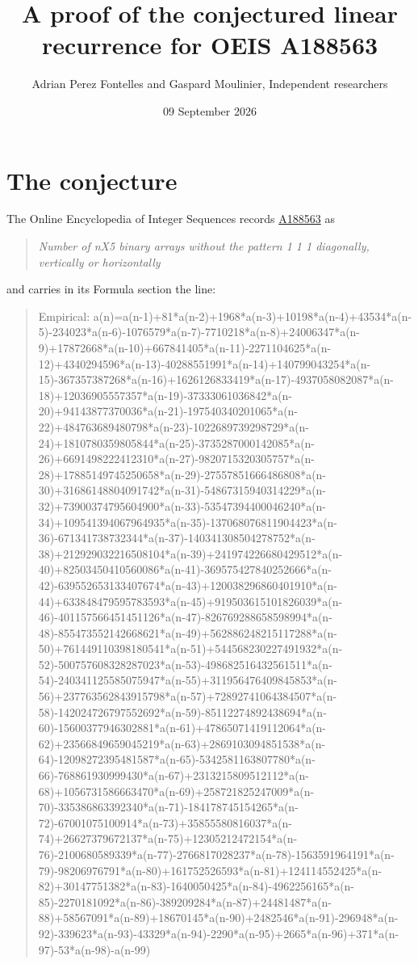 \documentclass[11pt]{article}
\title{A proof of the conjectured linear recurrence for OEIS A188563}
\author{Adrian Perez Fontelles and Gaspard Moulinier, Independent researchers}
\date{09 September 2026}
\theoremstyle{definition}
\begin{document}
\maketitle
\section{The conjecture}

The Online Encyclopedia of Integer Sequences records \href{https://oeis.org/A188563}{A188563} as

\begin{quote}\itshape Number of nX5 binary arrays without the pattern 1 1 1 diagonally, vertically or horizontally\end{quote}

and carries in its Formula section the line:

\begin{quote}\ttfamily Empirical: a(n)=a(n-1)+81*a(n-2)+1968*a(n-3)+10198*a(n-4)+43534*a(n-5)-234023*a(n-6)-1076579*a(n-7)-7710218*a(n-8)+24006347*a(n-9)+17872668*a(n-10)+667841405*a(n-11)-2271104625*a(n-12)+4340294596*a(n-13)-40288551991*a(n-14)+140799043254*a(n-15)-367357387268*a(n-16)+1626126833419*a(n-17)-4937058082087*a(n-18)+12036905557357*a(n-19)-37333061036842*a(n-20)+94143877370036*a(n-21)-197540340201065*a(n-22)+484763689480798*a(n-23)-1022689739298729*a(n-24)+1810780359805844*a(n-25)-3735287000142085*a(n-26)+6691498222412310*a(n-27)-9820715320305757*a(n-28)+17885149745250658*a(n-29)-27557851666486808*a(n-30)+31686148804091742*a(n-31)-54867315940314229*a(n-32)+73900374795604900*a(n-33)-53547394400046240*a(n-34)+109541394067964935*a(n-35)-137068076811904423*a(n-36)-671341738732344*a(n-37)-140341308504278752*a(n-38)+212929032216508104*a(n-39)+241974226680429512*a(n-40)+82503450410560086*a(n-41)-369575427840252666*a(n-42)-639552653133407674*a(n-43)+120038296860401910*a(n-44)+633848479595783593*a(n-45)+919503615101826039*a(n-46)-401157566451451126*a(n-47)-826769288658598994*a(n-48)-855473552142668621*a(n-49)+562886248215117288*a(n-50)+761449110398180541*a(n-51)+544568230227491932*a(n-52)-500757608328287023*a(n-53)-498682516432561511*a(n-54)-240341125585075947*a(n-55)+311956476409845853*a(n-56)+237763562843915798*a(n-57)+72892741064384507*a(n-58)-142024726797552692*a(n-59)-85112274892438694*a(n-60)-15600377946302881*a(n-61)+47865071419112064*a(n-62)+23566849659045219*a(n-63)+2869103094851538*a(n-64)-12098272395481587*a(n-65)-5342581163807780*a(n-66)-768861930999430*a(n-67)+2313215809512112*a(n-68)+1056731586663470*a(n-69)+258721825247009*a(n-70)-335386863392340*a(n-71)-184178745154265*a(n-72)-67001075100914*a(n-73)+35855580816037*a(n-74)+26627379672137*a(n-75)+12305212472154*a(n-76)-2100680589339*a(n-77)-2766817028237*a(n-78)-1563591964191*a(n-79)-98206976791*a(n-80)+161752526593*a(n-81)+124114552425*a(n-82)+30147751382*a(n-83)-1640050425*a(n-84)-4962256165*a(n-85)-2270181092*a(n-86)-389209284*a(n-87)+24481487*a(n-88)+58567091*a(n-89)+18670145*a(n-90)+2482546*a(n-91)-296948*a(n-92)-339623*a(n-93)-43329*a(n-94)-2290*a(n-95)+2665*a(n-96)+371*a(n-97)-53*a(n-98)-a(n-99)\end{quote}
\end{document}

